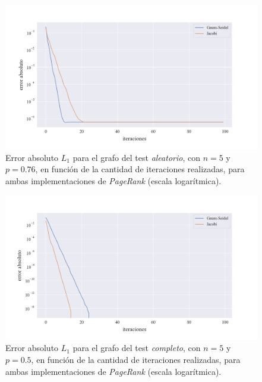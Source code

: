 \vspace{1em}
\begin{figure}[!htbp]
    \centering
    \includegraphics[width=.9\textwidth]{files/src/.media/convergencia_test_aleatorio.png}
    \caption{Error absoluto $L_1$ para el grafo del test \textit{aleatorio}, con $n = 5$ y $p = 0.76$, en función de la cantidad de iteraciones realizadas, para ambas implementaciones de \textit{PageRank} (escala logarítmica).} \label{test_aleatorio}
\end{figure}

\vspace{1em}
\begin{figure}[!htbp]
    \centering
    \includegraphics[width=.9\textwidth]{files/src/.media/convergencia_test_completo.png}
    \caption{Error absoluto $L_1$ para el grafo del test \textit{completo}, con $n = 5$ y $p = 0.5$, en función de la cantidad de iteraciones realizadas, para ambas implementaciones de \textit{PageRank} (escala logarítmica).} \label{test_completo}
\end{figure}

